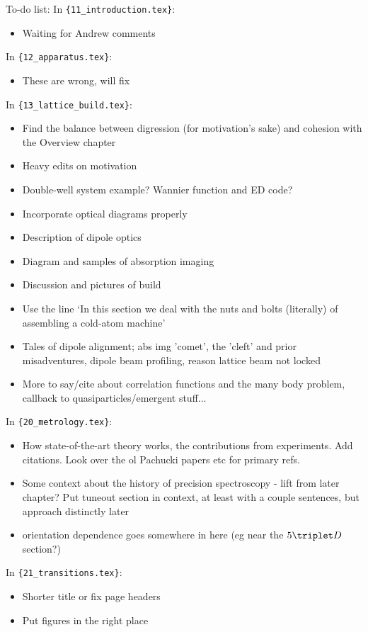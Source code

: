 To-do list:\newline
In \verb|{11_introduction.tex}|:
\begin{itemize}
\item {Waiting for Andrew comments}
\end{itemize}
In \verb|{12_apparatus.tex}|:
\begin{itemize}
\item {These are wrong, will fix}
\end{itemize}
In \verb|{13_lattice_build.tex}|:
\begin{itemize}
\item {Find the balance between digression (for motivation's sake) and cohesion with the Overview chapter}
\item {Heavy edits on motivation}
\item {Double-well system example? Wannier function and ED code?}
\item {Incorporate optical diagrams properly}
\item {Description of dipole optics}
\item {Diagram and samples of absorption imaging}
\item {Discussion and pictures of build}
\item {Use the line `In this section we deal with the nuts and bolts (literally) of assembling a cold-atom machine'}
\item {Tales of dipole alignment; abs img 'comet', the 'cleft' and prior misadventures, dipole beam profiling, reason lattice beam not locked}
\item {More to say/cite about correlation functions and the many body problem, callback to quasiparticles/emergent stuff...}
\end{itemize}
In \verb|{20_metrology.tex}|:
\begin{itemize}
\item {How state-of-the-art theory works, the contributions from experiments. Add citations. Look over the ol Pachucki papers etc for primary refs. }
\item {Some context about the history of precision spectroscopy - lift from later chapter? Put tuneout section in context, at least with a couple sentences, but approach distinctly later}
\item {orientation dependence goes somewhere in here (eg near the $5\triplet D$ section?)}
\end{itemize}
In \verb|{21_transitions.tex}|:
\begin{itemize}
\item {Shorter title or fix page headers}
\item {Put figures in the right place}
\end{itemize}
